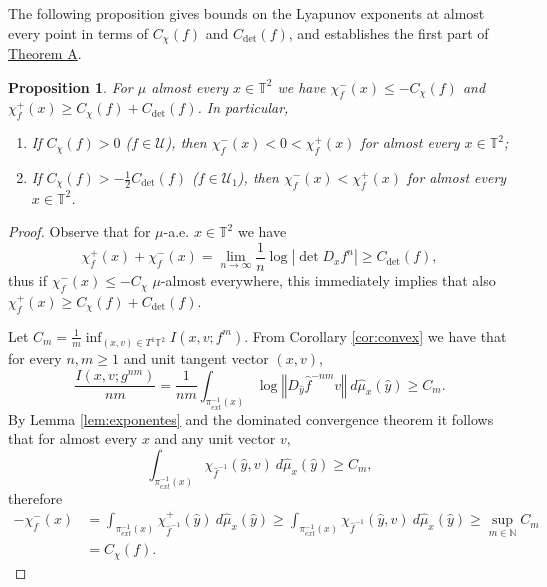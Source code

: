 \documentclass[11pt,letterpaper,reqno]{article}
\newtheorem{proposition}{Proposition}[section]
\newcommand{\norm}[1]{\left\Vert#1\right\Vert}
\newcommand{\TT}{\mathbb{T}^2}
\newcommand{\hf}{\hat{f}}
\newcommand{\hmu}{\hat{\mu}}
\newcommand{\hy}{\hat{y}}
\begin{document}
The following proposition gives bounds on the Lyapunov exponents at almost every point in terms of $C_{\chi}(f)$ and $C_{\det}(f)$, and establishes the first part of \hyperlink{theoremA}{Theorem A}.

\begin{proposition}\label{pro:existeexpneg}
For $\mu$ almost every $x\in\TT$ we have $\chi^{-}_f(x)\leq -C_{\chi}(f)$ and $\chi^{+}_f(x)\geq C_{\chi}(f)+C_{\det}(f)$.
In particular,
\begin{enumerate}
\item
If $C_{\chi}(f)>0$ ($f\in\mathcal U$), then $\chi_f^-(x)<0<\chi_f^+(x)$ for almost every $x\in\TT$;
\item
If $C_{\chi}(f)>-\frac 12C_{\det}(f)$ ($f\in\mathcal U_1$), then $\chi_f^-(x)<\chi_f^+(x)$ for almost every $x\in\TT$.
\end{enumerate}
\end{proposition}

\begin{proof}
Observe that for $\mu$-a.e. $x\in\TT$ we have
\[
 \chi^{+}_f(x)+\chi^{-}_f(x)=\lim_{n\rightarrow\infty}\frac 1n \log |\det D_xf^n|\geq C_{\det}(f),
\]
thus if $\chi^{-}_f(x)\leq -C_{\chi}$ $\mu$-almost everywhere, this immediately implies that also $\chi^{+}_f(x)\geq C_{\chi}(f)+C_{\det}(f)$.


Let $C_m=\frac 1m\inf_{(x,v)\in T^1\TT}I(x,v;f^m)$. From Corollary \ref{cor:convex} we have that for every $n,m\geq 1$ and unit tangent vector $(x,v)$,
\[
  \frac{I(x,v;g^{nm})}{nm}=\frac{1}{nm}\int_{\pi_{ext}^{-1}(x)} \log\norm{D_{\hy}\hf^{-nm}v}\ d\hmu_x(\hy)\geq C_m.
\]
By Lemma \ref{lem:exponentes} and the dominated convergence theorem it follows that for almost every $x$ and any unit vector $v$,
\[
\int_{\pi_{ext}^{-1}(x)} \chi_{\hf^{-1}}(\hy,v)\ d\hmu_x(\hy)\geq C_m,
\]
therefore
\begin{align*}
-\chi^-_f(x)&=\int_{\pi_{ext}^{-1}(x)} \chi_{\hf^{-1}}^{+}(\hy)\ d\hmu_x(\hy)\geq \int_{\pi_{ext}^{-1}(x)} \chi_{\hf^{-1}}(\hy,v)\ d\hmu_x(\hy)\geq \sup_{m\in\mathbb N}C_m\\
&=C_{\chi}(f).
\end{align*}
\end{proof}
\end{document}
